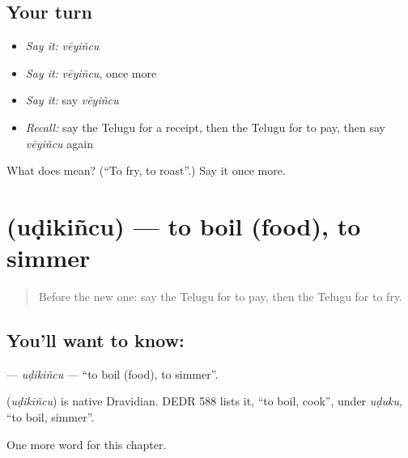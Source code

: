 \subsection*{Your turn}
\begin{itemize}
\raggedright
  \item \emph{Say it:} \emph{vēyiñcu}
  \item \emph{Say it:} \emph{vēyiñcu}, once more
  \item \emph{Say it:} say \emph{vēyiñcu}
  \item \emph{Recall:} say the Telugu for a receipt, then the Telugu for to pay, then say \emph{vēyiñcu} again
\end{itemize}

\begin{tcolorbox}[breakable,colback=teal!4,colframe=teal!35!black,title={Before you move on}]
What does  mean? (\textquotedblleft{}To fry, to roast\textquotedblright{}.) Say it once more.
\end{tcolorbox}
\section[\texorpdfstring{\te{ఉడికించు} (uḍikiñcu)}{ఉడికించు (uḍikiñcu)}]{ (uḍikiñcu) — to boil (food), to simmer}

\label{lesson:TE-C157-udikincu}



\begin{quote}
Before the new one: say the Telugu for to pay, then the Telugu for to fry.
\end{quote}

\subsection*{You'll want to know: }
\textbf{} — \emph{uḍikiñcu} — \textquotedblleft{}to boil (food), to simmer\textquotedblright{}.

\begin{cousinweb}
\textbf{} (\emph{uḍikiñcu}) is native Dravidian. DEDR 588 lists it, \textquotedblleft{}to boil, cook\textquotedblright{}, under \emph{uḍuku}, \textquotedblleft{}to boil, simmer\textquotedblright{}.
\end{cousinweb}

\begin{grammarlens}[title={What you've built}]
One more word for this chapter.
\end{grammarlens}

